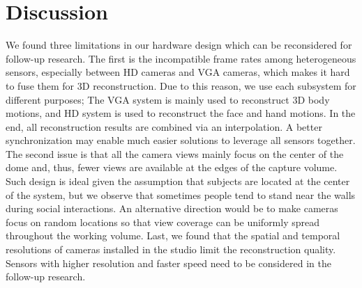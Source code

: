 \section{Discussion}
We found three limitations in our hardware design which can be reconsidered for follow-up research. The first is the incompatible frame rates among heterogeneous sensors, especially between HD cameras and VGA cameras, which makes it hard to fuse them for 3D reconstruction. Due to this reason, we use each subsystem for different purposes; The VGA system is mainly used to reconstruct 3D body motions, and HD system is used to reconstruct the face and hand motions. In the end, all reconstruction results are combined via an interpolation. A better synchronization may enable much easier solutions to leverage all sensors together. The second issue is that all the camera views mainly focus on the center of the dome and, thus, fewer views are available at the edges of the capture volume. Such design is ideal given the assumption that subjects are located at the center of the system, but we observe that sometimes people tend to stand near the walls during social interactions. An alternative direction would be to make cameras focus on random locations so that view coverage can be uniformly spread throughout the working volume. Last, we found that the spatial and temporal resolutions of cameras installed in the studio limit the reconstruction quality. Sensors with higher resolution and faster speed need to be considered in the follow-up research.


%
%




\pagebreak